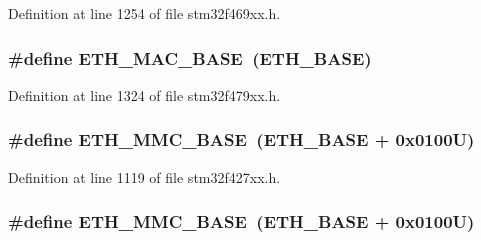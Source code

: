 Definition at line 1254 of file stm32f469xx.\+h.

\subsubsection[{\texorpdfstring{E\+T\+H\+\_\+\+M\+A\+C\+\_\+\+B\+A\+SE}{ETH_MAC_BASE}}]{\setlength{\rightskip}{0pt plus 5cm}\#define E\+T\+H\+\_\+\+M\+A\+C\+\_\+\+B\+A\+SE~({\bf E\+T\+H\+\_\+\+B\+A\+SE})}\hypertarget{group___peripheral__memory__map_ga3cf7005808feb61bff1fee01e50a711a}{}\label{group___peripheral__memory__map_ga3cf7005808feb61bff1fee01e50a711a}


Definition at line 1324 of file stm32f479xx.\+h.

\subsubsection[{\texorpdfstring{E\+T\+H\+\_\+\+M\+M\+C\+\_\+\+B\+A\+SE}{ETH_MMC_BASE}}]{\setlength{\rightskip}{0pt plus 5cm}\#define E\+T\+H\+\_\+\+M\+M\+C\+\_\+\+B\+A\+SE~({\bf E\+T\+H\+\_\+\+B\+A\+SE} + 0x0100\+U)}\hypertarget{group___peripheral__memory__map_ga4946f2b3b03f7998343ac1778fbcf725}{}\label{group___peripheral__memory__map_ga4946f2b3b03f7998343ac1778fbcf725}


Definition at line 1119 of file stm32f427xx.\+h.

\subsubsection[{\texorpdfstring{E\+T\+H\+\_\+\+M\+M\+C\+\_\+\+B\+A\+SE}{ETH_MMC_BASE}}]{\setlength{\rightskip}{0pt plus 5cm}\#define E\+T\+H\+\_\+\+M\+M\+C\+\_\+\+B\+A\+SE~({\bf E\+T\+H\+\_\+\+B\+A\+SE} + 0x0100\+U)}\hypertarget{group___peripheral__memory__map_ga4946f2b3b03f7998343ac1778fbcf725}{}\label{group___peripheral__memory__map_ga4946f2b3b03f7998343ac1778fbcf725}


